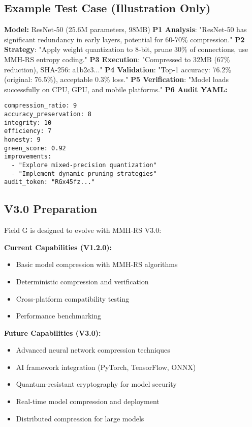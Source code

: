 \subsection*{Example Test Case (Illustration Only)}
\textbf{Model:} ResNet-50 (25.6M parameters, 98MB)  
\textbf{P1 Analysis}: "ResNet-50 has significant redundancy in early layers, potential for 60-70\% compression."  
\textbf{P2 Strategy}: "Apply weight quantization to 8-bit, prune 30\% of connections, use MMH-RS entropy coding."  
\textbf{P3 Execution}: "Compressed to 32MB (67\% reduction), SHA-256: a1b2c3..."  
\textbf{P4 Validation}: "Top-1 accuracy: 76.2\% (original: 76.5\%), acceptable 0.3\% loss."  
\textbf{P5 Verification}: "Model loads successfully on CPU, GPU, and mobile platforms."  
\textbf{P6 Audit YAML:}
\begin{verbatim}
compression_ratio: 9
accuracy_preservation: 8
integrity: 10
efficiency: 7
honesty: 9
green_score: 0.92
improvements:
  - "Explore mixed-precision quantization"
  - "Implement dynamic pruning strategies"
audit_token: "RGx45fz..."
\end{verbatim}

\subsection*{V3.0 Preparation}
Field G is designed to evolve with MMH-RS V3.0:

\textbf{Current Capabilities (V1.2.0):}
\begin{itemize}
  \item Basic model compression with MMH-RS algorithms
  \item Deterministic compression and verification
  \item Cross-platform compatibility testing
  \item Performance benchmarking
\end{itemize}

\textbf{Future Capabilities (V3.0):}
\begin{itemize}
  \item Advanced neural network compression techniques
  \item AI framework integration (PyTorch, TensorFlow, ONNX)
  \item Quantum-resistant cryptography for model security
  \item Real-time model compression and deployment
  \item Distributed compression for large models
\end{itemize} 